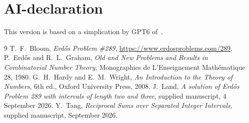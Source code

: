 \documentclass[11pt]{article}
\begin{document}
\section*{AI-declaration}

This version is based on a simplication by GPT6 of~\cite{Land,Tang}.

\begin{thebibliography}{9}
T.~F.~Bloom,
\emph{Erd\H{o}s Problem \#289},
\url{https://www.erdosproblems.com/289}.
 P.~Erd\H{o}s and R.~L.~Graham,
\emph{Old and New Problems and Results in Combinatorial Number Theory},
Monographies de L'Enseignement Math\'ematique 28, 1980.
 G.~H.~Hardy and E.~M.~Wright,
\emph{An Introduction to the Theory of Numbers}, 6th ed.,
Oxford University Press, 2008.
 J.~Land,
\emph{A solution of Erd\H{o}s Problem 289 with intervals of length two and three},
supplied manuscript, 4 September 2026.
 Y.~Tang,
\emph{Reciprocal Sums over Separated Integer Intervals},
supplied manuscript, September 2026.
\end{thebibliography}
\end{document}
